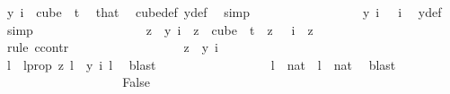 \begin{isabellebody}
\ {\isachardoublequoteopen}y\ i\ {\isasymin}\ {\isacharparenleft}{\kern0pt}cube\ {}\ t{\isacharparenright}{\kern0pt}{\isachardoublequoteclose}\ \isamarkupfalse%
\ that\ \isamarkupfalse%
\ cube{\isacharunderscore}{\kern0pt}def\ y{\isacharunderscore}{\kern0pt}def\ \isamarkupfalse%
\ simp\isanewline
\ \ \ \ \ \ \ \ \ \ \ \ \ \ \isamarkupfalse%
\ \isamarkupfalse%
\ {\isachardoublequoteopen}y\ i\ {}\ {\isacharequal}{\kern0pt}\ i{\isachardoublequoteclose}\ \isamarkupfalse%
\ y{\isacharunderscore}{\kern0pt}def\ \isamarkupfalse%
\ simp\isanewline
\ \ \ \ \ \ \ \ \ \ \ \ \ \ \isamarkupfalse%
\ \isamarkupfalse%
\ {\isachardoublequoteopen}z\ {\isacharequal}{\kern0pt}\ y\ i{\isachardoublequoteclose}\ \ {\isachardoublequoteopen}z\ {\isasymin}\ cube\ {}\ t{\isachardoublequoteclose}\ \ {\isachardoublequoteopen}z\ {}\ {\isacharequal}{\kern0pt}\ i{\isachardoublequoteclose}\ \ z\isanewline
\ \ \ \ \ \ \ \ \ \ \ \ \ \ \isamarkupfalse%
\ {\isacharparenleft}{\kern0pt}rule\ ccontr{\isacharparenright}{\kern0pt}\isanewline
\ \ \ \ \ \ \ \ \ \ \ \ \ \ \ \ \isamarkupfalse%
\ {\isachardoublequoteopen}z\ {\isasymnoteq}\ y\ i{\isachardoublequoteclose}\ \isanewline
\ \ \ \ \ \ \ \ \ \ \ \ \ \ \ \ \isamarkupfalse%
\ \isamarkupfalse%
\ l\ \ l{\isacharunderscore}{\kern0pt}prop{\isacharcolon}{\kern0pt}\ {\isachardoublequoteopen}z\ l\ {\isasymnoteq}\ y\ i\ l{\isachardoublequoteclose}\ \isamarkupfalse%
\ blast\isanewline
\ \ \ \ \ \ \ \ \ \ \ \ \ \ \ \ \isamarkupfalse%
\ {\isachardoublequoteopen}l\ {\isasymin}\ {\isacharbraceleft}{\kern0pt}{\isachardot}{\kern0pt}{\isachardot}{\kern0pt}{\isacharless}{\kern0pt}{}{\isacharcolon}{\kern0pt}{\isacharcolon}{\kern0pt}nat{\isacharbraceright}{\kern0pt}{\isachardoublequoteclose}\ {\isacharbar}{\kern0pt}\ {\isachardoublequoteopen}l\ {\isasymnotin}\ {\isacharbraceleft}{\kern0pt}{\isachardot}{\kern0pt}{\isachardot}{\kern0pt}{\isacharless}{\kern0pt}{}{\isacharcolon}{\kern0pt}{\isacharcolon}{\kern0pt}nat{\isacharbraceright}{\kern0pt}{\isachardoublequoteclose}\ \isamarkupfalse%
\ blast\isanewline
\ \ \ \ \ \ \ \ \ \ \ \ \ \ \ \ \isamarkupfalse%
\ \isamarkupfalse%
\ False\isanewline
\ \ \ \ \ \ \ \ \ \ \ \ \ \ \ \ \isamarkupfalse%

\end{isabellebody}
